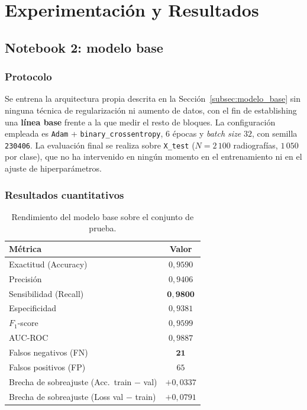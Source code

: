 \documentclass[11pt, a4paper]{article}
\numberwithin{equation}{section}
\begin{document}
\newpage
\section{Experimentación y Resultados}
\subsection{Notebook 2: modelo base}
\label{subsec:exp_notebook2}

\subsubsection{Protocolo}

Se entrena la arquitectura propia descrita en la Sección~\ref{subsec:modelo_base} sin
ninguna técnica de regularización ni aumento de datos, con el fin de establishing
una \textbf{línea base} frente a la que medir el resto de bloques. La configuración
empleada es \texttt{Adam} + \texttt{binary\_crossentropy}, $6$ épocas y
\textit{batch size} $32$, con semilla \texttt{230406}. La evaluación final se realiza
sobre \texttt{X\_test} ($N = 2\,100$ radiografías, $1\,050$ por clase), que no ha
intervenido en ningún momento en el entrenamiento ni en el ajuste de hiperparámetros.

\subsubsection{Resultados cuantitativos}

\begin{table}[H]
\centering
\caption{Rendimiento del modelo base sobre el conjunto de prueba.}
\label{tab:resultados_base}
\begin{tabular}{lc}
\toprule
\textbf{Métrica} & \textbf{Valor} \\
\midrule
Exactitud (Accuracy)              & $0{,}9590$ \\
Precisión                         & $0{,}9406$ \\
Sensibilidad (Recall)             & $\mathbf{0{,}9800}$ \\
Especificidad                     & $0{,}9381$ \\
$F_1$-score                       & $0{,}9599$ \\
AUC-ROC                           & $0{,}9887$ \\
\midrule
Falsos negativos (FN)             & $\mathbf{21}$ \\
Falsos positivos (FP)             & $65$ \\
\midrule
Brecha de sobreajuste (Acc.\ train $-$ val) & $+0{,}0337$ \\
Brecha de sobreajuste (Loss val $-$ train)  & $+0{,}0791$ \\
\bottomrule
\end{tabular}
\end{table}
\end{document}
